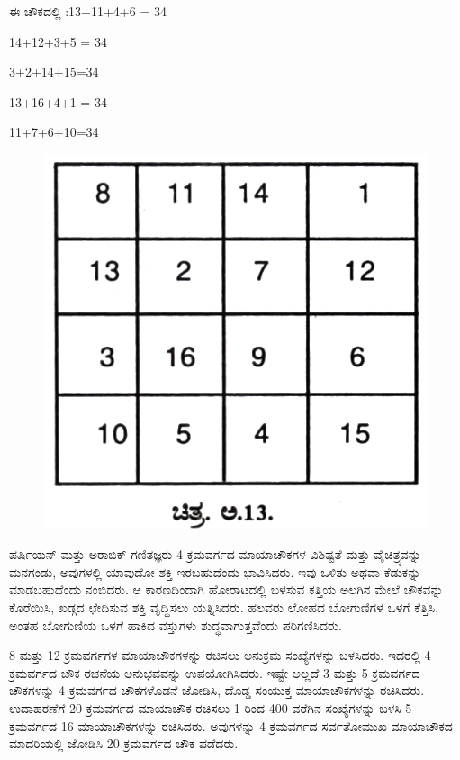 ಈ ಚೌಕದಲ್ಲಿ :13+11+4+6 = 34

14+12+3+5 = 34

3+2+14+15=34

13+16+4+1 = 34

11+7+6+10=34
\begin{figure}[H]
\includegraphics{src/figures/chap9/fig9-9.jpg}
\end{figure}

ಪರ್ಷಿಯನ್ ಮತ್ತು ಅರಾಬಿಕ್ ಗಣಿತಜ್ಞರು 4 ಕ್ರಮವರ್ಗದ ಮಾಯಾಚೌಕಗಳ ವಿಶಿಷ್ಟತೆ ಮತ್ತು ವೈಚಿತ್ರ್ಯವನ್ನು ಮನಗಂಡು, ಅವುಗಳಲ್ಲಿ ಯಾವುದೋ ಶಕ್ತಿ ಇರಬಹುದೆಂದು ಭಾವಿಸಿದರು. ಇವು ಒಳಿತು ಅಥವಾ ಕೆಡುಕನ್ನು ಮಾಡಬಹುದೆಂದು ನಂಬಿದರು. ಆ ಕಾರಣದಿಂದಾಗಿ ಹೋರಾಟದಲ್ಲಿ ಬಳಸುವ ಕತ್ತಿಯ ಅಲಗಿನ ಮೇಲೆ ಚೌಕವನ್ನು ಕೊರೆಯಿಸಿ, ಖಡ್ಗದ ಛೇದಿಸುವ ಶಕ್ತಿ ವೃದ್ಧಿಸಲು ಯತ್ನಿಸಿದರು. ಹಲವರು ಲೋಹದ ಬೋಗುಣಿಗಳ ಒಳಗೆ ಕೆತ್ತಿಸಿ, ಅಂತಹ ಬೋಗುಣಿಯ ಒಳಗೆ ಹಾಕಿದ ವಸ್ತುಗಳು ಶುದ್ಧವಾಗುತ್ತವೆಂದು ಪರಿಗಣಿಸಿದರು.

8 ಮತ್ತು 12 ಕ್ರಮವರ್ಗಗಳ ಮಾಯಾಚೌಕಗಳನ್ನು ರಚಿಸಲು ಅನುಕ್ರಮ ಸಂಖ್ಯೆಗಳನ್ನು ಬಳಸಿದರು. ಇದರಲ್ಲಿ 4 ಕ್ರಮವರ್ಗದ ಚೌಕ ರಚನೆಯ ಅನುಭವವನ್ನು ಉಪಯೋಗಿಸಿದರು. ಇಷ್ಟೇ ಅಲ್ಲದೆ 3 ಮತ್ತು 5 ಕ್ರಮವರ್ಗದ ಚೌಕಗಳನ್ನು 4 ಕ್ರಮವರ್ಗದ ಚೌಕಗಳೊಡನೆ ಜೋಡಿಸಿ, ದೊಡ್ಡ ಸಂಯುಕ್ತ ಮಾಯಾಚೌಕಗಳನ್ನು ರಚಿಸಿದರು. ಉದಾಹರಣೆಗೆ 20 ಕ್ರಮ\-ವರ್ಗದ ಮಾಯಾಚೌಕ ರಚಿಸಲು 1 ರಿಂದ 400 ವರೆಗಿನ ಸಂಖ್ಯೆಗಳನ್ನು ಬಳಸಿ 5 ಕ್ರಮವರ್ಗದ 16 ಮಾಯಾಚೌಕಗಳನ್ನು ರಚಿಸಿದರು. ಅವುಗಳನ್ನು 4 ಕ್ರಮವರ್ಗದ ಸರ್ವತೋಮುಖ \break ಮಾಯಾಚೌಕದ ಮಾದರಿಯಲ್ಲಿ ಜೋಡಿಸಿ 20 ಕ್ರಮವರ್ಗದ ಚೌಕ ಪಡೆದರು.

